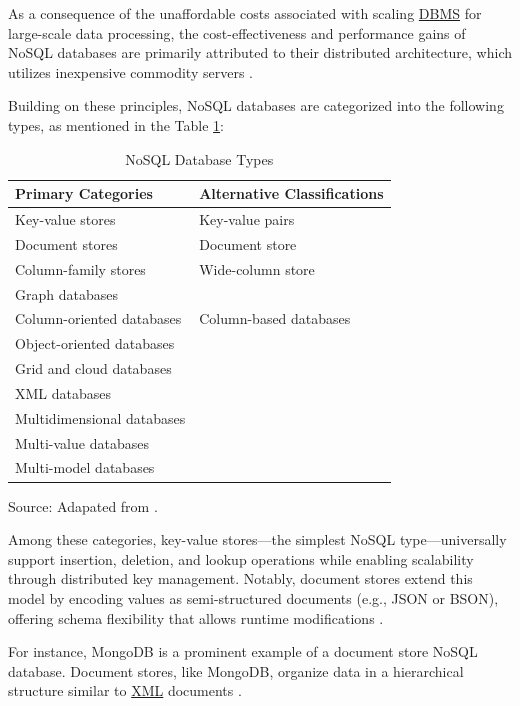 As a consequence of the unaffordable costs associated with scaling \hyperref[appendix:glossary]{DBMS} for large-scale data processing, the cost-effectiveness and performance gains of NoSQL databases are primarily attributed to their distributed architecture, which utilizes inexpensive commodity servers \cite{mohan2013history}.

Building on these principles, NoSQL databases are categorized into the following types, as mentioned in the Table \ref{nosql_database_types}:

\begin{table}[H]
\centering
\caption{NoSQL Database Types}
\label{nosql_database_types}
\begin{tabular}{p{}p{}}
\toprule
\textbf{Primary Categories} & \textbf{Alternative Classifications} \\
\midrule
Key-value stores & Key-value pairs \\ \hline
Document stores & Document store \\ \hline
Column-family stores & Wide-column store \\ \hline
Graph databases &  \\ \hline
Column-oriented databases & Column-based databases \\ \hline
Object-oriented databases &  \\ \hline
Grid and cloud databases &  \\ \hline
XML databases &  \\ \hline
Multidimensional databases &  \\ \hline
Multi-value databases &  \\ \hline
Multi-model databases &  \\
\bottomrule
\end{tabular}
\footnotesize Source: Adapated from \cite{abramova2014nosql, cattell2011scalable, davoudianchenliu2018, jatana2012survey, mason2015nosql}.
\end{table}

Among these categories, key-value stores—the simplest NoSQL type—universally support insertion, deletion, and lookup operations while enabling scalability through distributed key management. Notably, document stores extend this model by encoding values as semi-structured documents (e.g., JSON or BSON), offering schema flexibility that allows runtime modifications
 \cite{abramova2014nosql, cattell2011scalable, davoudianchenliu2018}.

For instance, MongoDB is a prominent example of a document store NoSQL database. Document stores, like MongoDB, organize data in a hierarchical structure similar to \hyperref[appendix:glossary]{XML} documents \cite{agrawal2015survey, mason2015nosql}.

